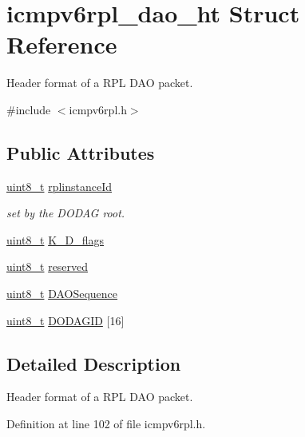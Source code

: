 \hypertarget{structicmpv6rpl__dao__ht}{}\section{icmpv6rpl\+\_\+dao\+\_\+ht Struct Reference}
\label{structicmpv6rpl__dao__ht}


Header format of a R\+PL D\+AO packet.  




{\ttfamily \#include $<$icmpv6rpl.\+h$>$}

\subsection*{Public Attributes}
\begin{DoxyCompactItemize}
\item 
\hyperlink{_p_e___types_8h_aba7bc1797add20fe3efdf37ced1182c5}{uint8\+\_\+t} \hyperlink{structicmpv6rpl__dao__ht_a206c5a7e60c2feec5609449f09a1bc6c}{rplinstance\+Id}
\begin{DoxyCompactList}\small\item\em set by the D\+O\+D\+AG root. \end{DoxyCompactList}\item 
\hyperlink{_p_e___types_8h_aba7bc1797add20fe3efdf37ced1182c5}{uint8\+\_\+t} \hyperlink{structicmpv6rpl__dao__ht_a05e862b83a69fb551303a313a548a29f}{K\+\_\+\+D\+\_\+flags}
\item 
\hyperlink{_p_e___types_8h_aba7bc1797add20fe3efdf37ced1182c5}{uint8\+\_\+t} \hyperlink{structicmpv6rpl__dao__ht_ad3393e8819d79dcc901afc934ce8c3ef}{reserved}
\item 
\hyperlink{_p_e___types_8h_aba7bc1797add20fe3efdf37ced1182c5}{uint8\+\_\+t} \hyperlink{structicmpv6rpl__dao__ht_ae250934e58471f9313bd5368dd0e77e7}{D\+A\+O\+Sequence}
\item 
\hyperlink{_p_e___types_8h_aba7bc1797add20fe3efdf37ced1182c5}{uint8\+\_\+t} \hyperlink{structicmpv6rpl__dao__ht_a0e7cb9d02da09d489a9a2d22727a8a8d}{D\+O\+D\+A\+G\+ID} \mbox{[}16\mbox{]}
\end{DoxyCompactItemize}


\subsection{Detailed Description}
Header format of a R\+PL D\+AO packet. 

Definition at line 102 of file icmpv6rpl.\+h.



